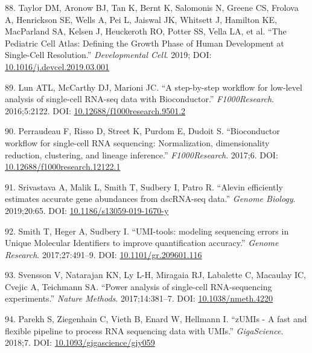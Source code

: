 \documentclass[11pt,a4paper,titlepage,twoside,openright]{style/unimelbthesis}
\theoremstyle{definition}
\theoremstyle{definition}
\theoremstyle{definition}
\theoremstyle{remark}
\begin{document}
\begin{mainmatter}
\leavevmode\hypertarget{ref-Taylor2019-hy}{}%
88. Taylor DM, Aronow BJ, Tan K, Bernt K, Salomonis N, Greene CS, Frolova A, Henrickson SE, Wells A, Pei L, Jaiswal JK, Whitsett J, Hamilton KE, MacParland SA, Kelsen J, Heuckeroth RO, Potter SS, Vella LA, et al. ``The Pediatric Cell Atlas: Defining the Growth Phase of Human Development at Single-Cell Resolution.'' \emph{Developmental Cell}. 2019; DOI: \href{https://doi.org/10.1016/j.devcel.2019.03.001}{10.1016/j.devcel.2019.03.001}

\leavevmode\hypertarget{ref-Lun2016-lp}{}%
89. Lun ATL, McCarthy DJ, Marioni JC. ``A step-by-step workflow for low-level analysis of single-cell RNA-seq data with Bioconductor.'' \emph{F1000Research}. 2016;5:2122. DOI: \href{https://doi.org/10.12688/f1000research.9501.2}{10.12688/f1000research.9501.2}

\leavevmode\hypertarget{ref-Perraudeau2017-ii}{}%
90. Perraudeau F, Risso D, Street K, Purdom E, Dudoit S. ``Bioconductor workflow for single-cell RNA sequencing: Normalization, dimensionality reduction, clustering, and lineage inference.'' \emph{F1000Research}. 2017;6. DOI: \href{https://doi.org/10.12688/f1000research.12122.1}{10.12688/f1000research.12122.1}

\leavevmode\hypertarget{ref-Srivastava2019-ce}{}%
91. Srivastava A, Malik L, Smith T, Sudbery I, Patro R. ``Alevin efficiently estimates accurate gene abundances from dscRNA-seq data.'' \emph{Genome Biology}. 2019;20:65. DOI: \href{https://doi.org/10.1186/s13059-019-1670-y}{10.1186/s13059-019-1670-y}

\leavevmode\hypertarget{ref-Smith2017-nz}{}%
92. Smith T, Heger A, Sudbery I. ``UMI-tools: modeling sequencing errors in Unique Molecular Identifiers to improve quantification accuracy.'' \emph{Genome Research}. 2017;27:491--9. DOI: \href{https://doi.org/10.1101/gr.209601.116}{10.1101/gr.209601.116}

\leavevmode\hypertarget{ref-Svensson2017-zo}{}%
93. Svensson V, Natarajan KN, Ly L-H, Miragaia RJ, Labalette C, Macaulay IC, Cvejic A, Teichmann SA. ``Power analysis of single-cell RNA-sequencing experiments.'' \emph{Nature Methods}. 2017;14:381--7. DOI: \href{https://doi.org/10.1038/nmeth.4220}{10.1038/nmeth.4220}

\leavevmode\hypertarget{ref-Parekh2018-ug}{}%
94. Parekh S, Ziegenhain C, Vieth B, Enard W, Hellmann I. ``zUMIs - A fast and flexible pipeline to process RNA sequencing data with UMIs.'' \emph{GigaScience}. 2018;7. DOI: \href{https://doi.org/10.1093/gigascience/giy059}{10.1093/gigascience/giy059}


\end{mainmatter}
\end{document}
